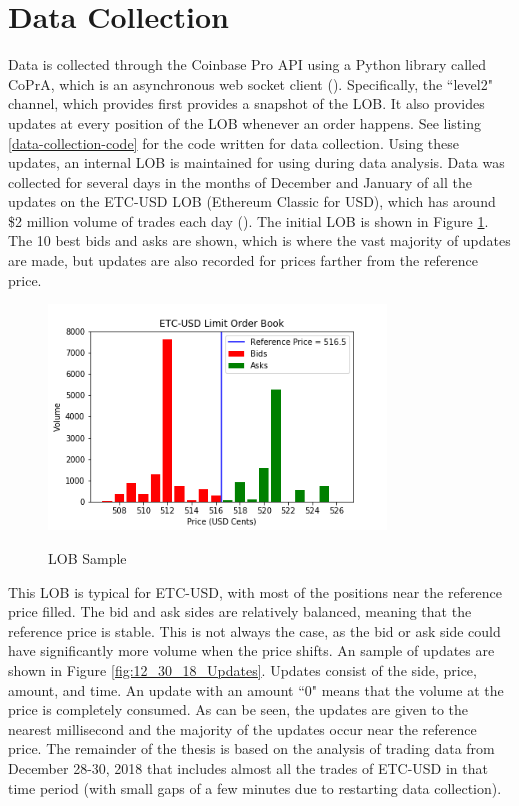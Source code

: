 \section{Data Collection}
Data is collected through the Coinbase Pro API using a Python library called CoPrA, which is an asynchronous web socket client (\cite{L3}). Specifically, the ``level2" channel, which provides first provides a snapshot of the LOB. It also provides updates at every position of the LOB whenever an order happens. See listing \ref{data-collection-code} for the code written for data collection. Using these updates, an internal LOB is maintained for using during data analysis. Data was collected for several days in the months of December and January of all the updates on the ETC-USD LOB (Ethereum Classic for USD), which has around \$2 million volume of trades each day (\cite{L1}). The initial LOB is shown in Figure \ref{fig:12_30_18_LOB_pic}. The 10 best bids and asks are shown, which is where the vast majority of updates are made, but updates are also recorded for prices farther from the reference price.

\begin{figure}[t]
\begin{center}
\caption{LOB Sample}
\includegraphics[width=0.8\textwidth]{Figures/12_30_18_LOB.png}
\label{fig:12_30_18_LOB_pic}
\end{center}
\end{figure}

This LOB is typical for ETC-USD, with most of the positions near the reference price filled. The bid and ask sides are relatively balanced, meaning that the reference price is stable. This is not always the case, as the bid or ask side could have significantly more volume when the price shifts. An sample of updates are shown in Figure \ref{fig:12_30_18_Updates}. Updates consist of the side, price, amount, and time. An update with an amount ``0" means that the volume at the price is completely consumed. As can be seen, the updates are given to the nearest millisecond and the majority of the updates occur near the reference price. The remainder of the thesis is based on the analysis of trading data from December 28-30, 2018 that includes almost all the trades of ETC-USD in that time period (with small gaps of a few minutes due to restarting data collection).

